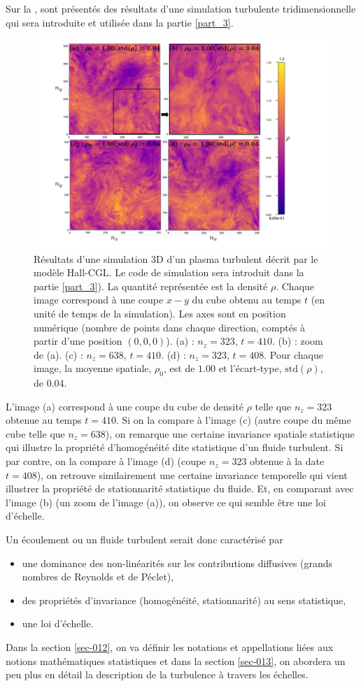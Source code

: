  Sur la , sont présentés des résultats d'une simulation turbulente tridimensionnelle qui sera introduite et utilisée dans la partie \ref{part_3}. 
\begin{figure}[!ht]
 \centering
\includegraphics[width=0.8\linewidth,trim=2cm 0cm 4cm 0cm, clip=true]{./Part_0/images/simu_panel_rho}
\cprotect\caption{Résultats d'une simulation 3D d'un plasma turbulent décrit par le modèle Hall-CGL. Le code de simulation sera introduit dans la partie \ref{part_3}). La quantité représentée est la densité $\rho$. Chaque image correspond à une coupe $x-y$ du cube obtenu au temps $t$ (en unité de temps de la simulation). Les axes sont en position numérique (nombre de points dans chaque direction, comptés à partir d'une position $(0,0,0)$). (a) : $n_z=323$, $t=410$. (b) : zoom de (a). (c) : $n_z=638$, $t=410$. (d) : $n_z=323$, $t=408$. Pour chaque image, la moyenne spatiale, $\rho_0$, est de $\num{1.00}$ et l'écart-type, $\text{std}(\rho)$, de $\num{0.04}$.}
\label{fig:comp_turbul}
\end{figure}
L'image (a) correspond à une coupe du cube de densité $\rho$ telle que $n_z=323$ obtenue au temps $t=410$. Si on la compare à l'image (c) (autre coupe du même cube telle que $n_z=638$), on remarque une certaine invariance spatiale statistique qui illustre la propriété d'homogénéité dite statistique d'un fluide turbulent. Si par contre, on la compare à l'image (d) (coupe $n_z=323$ obtenue à la date $t=408$), on retrouve similairement une certaine invariance temporelle qui vient illustrer la propriété de stationnarité statistique du fluide. Et, en comparant avec l'image (b) (un zoom de l'image (a)), on observe ce qui semble être une loi d'échelle. 

Un écoulement ou un fluide turbulent serait donc caractérisé par 
\begin{itemize}
    \item une dominance des non-linéarités sur les contributions diffusives (grands nombres de Reynolds et de Péclet),
    \item des propriétés d'invariance (homogénéité, stationnarité) au sens statistique,
    \item une loi d'échelle.
\end{itemize}
Dans la section \ref{sec-012}, on va définir les notations et appellations liées aux notions mathématiques statistiques et dans la section \ref{sec-013}, on abordera un peu plus en détail la description de la turbulence à travers les échelles.

